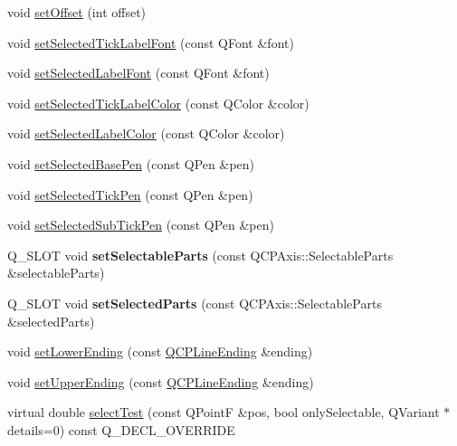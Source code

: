 \begin{DoxyCompactItemize}
\item 
void \hyperlink{class_q_c_p_axis_a04a652603cbe50eba9969ee6d68873c3}{set\+Offset} (int offset)
\item 
void \hyperlink{class_q_c_p_axis_a845ccb560b7bc5281098a5be494145f6}{set\+Selected\+Tick\+Label\+Font} (const Q\+Font \&font)
\item 
void \hyperlink{class_q_c_p_axis_a02ec2a75d4d8401eaab834fbc6803d30}{set\+Selected\+Label\+Font} (const Q\+Font \&font)
\item 
void \hyperlink{class_q_c_p_axis_a9bdbf5e63ab15187f3a1de9440129227}{set\+Selected\+Tick\+Label\+Color} (const Q\+Color \&color)
\item 
void \hyperlink{class_q_c_p_axis_a5d502dec597c634f491fdd73d151c72d}{set\+Selected\+Label\+Color} (const Q\+Color \&color)
\item 
void \hyperlink{class_q_c_p_axis_aeb917a909215605b95ef2be843de1ee8}{set\+Selected\+Base\+Pen} (const Q\+Pen \&pen)
\item 
void \hyperlink{class_q_c_p_axis_a8360502685eb782edbf04019c9345cdc}{set\+Selected\+Tick\+Pen} (const Q\+Pen \&pen)
\item 
void \hyperlink{class_q_c_p_axis_a2a00a7166600155eac26843132eb9576}{set\+Selected\+Sub\+Tick\+Pen} (const Q\+Pen \&pen)
\item 
\mbox{\label{class_q_c_p_axis_ab2d5ab07ad9e7f0e5529e1fb5d00712e}} 
Q\+\_\+\+S\+L\+OT void {\bfseries set\+Selectable\+Parts} (const Q\+C\+P\+Axis\+::\+Selectable\+Parts \&selectable\+Parts)
\item 
\mbox{\label{class_q_c_p_axis_a816a132715d851b7016c9740b880464c}} 
Q\+\_\+\+S\+L\+OT void {\bfseries set\+Selected\+Parts} (const Q\+C\+P\+Axis\+::\+Selectable\+Parts \&selected\+Parts)
\item 
void \hyperlink{class_q_c_p_axis_a08af1c72db9ae4dc8cb8a973d44405ab}{set\+Lower\+Ending} (const \hyperlink{class_q_c_p_line_ending}{Q\+C\+P\+Line\+Ending} \&ending)
\item 
void \hyperlink{class_q_c_p_axis_a69119b892fc306f651763596685aa377}{set\+Upper\+Ending} (const \hyperlink{class_q_c_p_line_ending}{Q\+C\+P\+Line\+Ending} \&ending)
\item 
virtual double \hyperlink{class_q_c_p_axis_a63b7103c57fe9acfbce164334ea837f8}{select\+Test} (const Q\+PointF \&pos, bool only\+Selectable, Q\+Variant $\ast$details=0) const Q\+\_\+\+D\+E\+C\+L\+\_\+\+O\+V\+E\+R\+R\+I\+DE

\end{DoxyCompactItemize}
